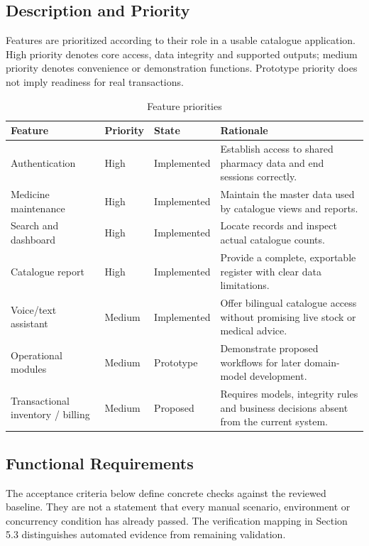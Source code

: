 \documentclass{article}
\begin{document}
\subsection{Description and Priority}
Features are prioritized according to their role in a usable catalogue application. High priority denotes core access, data integrity and supported outputs; medium priority denotes convenience or demonstration functions. Prototype priority does not imply readiness for real transactions.
\begin{table}[H]
\centering\small
\caption{Feature priorities}
\begin{tabularx}{\textwidth}{L{35mm}L{19mm}L{24mm}Y}
\toprule Feature & Priority & State & Rationale\\\midrule
Authentication & High & Implemented & Establish access to shared pharmacy data and end sessions correctly.\\
Medicine maintenance & High & Implemented & Maintain the master data used by catalogue views and reports.\\
Search and dashboard & High & Implemented & Locate records and inspect actual catalogue counts.\\
Catalogue report & High & Implemented & Provide a complete, exportable register with clear data limitations.\\
Voice/text assistant & Medium & Implemented & Offer bilingual catalogue access without promising live stock or medical advice.\\
Operational modules & Medium & Prototype & Demonstrate proposed workflows for later domain-model development.\\
Transactional inventory / billing & Medium & Proposed & Requires models, integrity rules and business decisions absent from the current system.\\
\bottomrule
\end{tabularx}
\end{table}

\subsection{Functional Requirements}
The acceptance criteria below define concrete checks against the reviewed baseline. They are not a statement that every manual scenario, environment or concurrency condition has already passed. The verification mapping in Section 5.3 distinguishes automated evidence from remaining validation.
\end{document}
